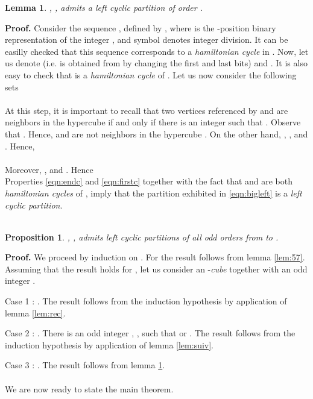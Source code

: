 \documentclass{article}
\newtheorem{lemma}{Lemma}
\newtheorem{proposition}{Proposition}
\begin{document}
\begin{lemma}  \label{lem:ipmax}
, , admits a {\em left 
cyclic} partition of order .
\end{lemma}
{\bf Proof.} Consider the sequence ,
defined by , where  is the
-position binary representation of the integer , and symbol  denotes integer
division. It can be easilly checked that this sequence corresponds to a {\em
  hamiltonian cycle} in . Now, let us denote  (i.e.  is obtained from  by changing the first and last
bits) and . It is also easy to check that  is a {\em hamiltonian cycle} of . Let us now consider the following
sets\\
\\
At this step, it is important to recall that two vertices referenced by 
and  are neighbors in the hypercube if and only if there is an integer 
such that . Observe that . Hence,  and  are
not neighbors in the hypercube  . On the other hand, ,
 ,  and . Hence, \\
\\
Moreover, ,  and
. Hence 
\\
Properties \ref{eqn:endc} and \ref{eqn:firstc} together with the fact that
 and  are both {\em hamiltonian cycles} of , imply that the
partition exhibited in \ref{eqn:bigleft} is a {\em left cyclic partition}. \\    
 \\
\begin{proposition}   \label{prop:ip}
, , admits left cyclic partitions of all odd orders 
from  to . 
\end{proposition}
{\bf Proof.} We proceed by induction on .
For  the result follows from lemma \ref{lem:57}.\\
Assuming that the result holds for , let us consider an -{\em cube} together with an odd integer .

 Case 1 : . The result follows from the 
induction hypothesis by application of lemma \ref{lem:rec}.

 Case 2 : . There is an odd integer , 
, such that  or  
. The result follows from the induction hypothesis by application of
lemma \ref{lem:suiv}.

 Case 3 : . The result follows from lemma \ref{lem:ipmax}.\\

\\

We are now ready to state the main theorem.
\end{document}
